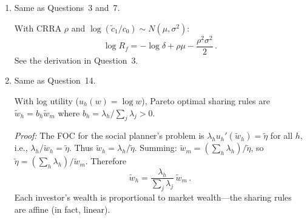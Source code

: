 \begin{enumerate}
\item Same as Questions~3 and~7.

With CRRA $\rho$ and $\log(\tilde{c}_1/c_0)\sim N(\mu,\sigma^2)$:
\[
\log R_f = -\log\delta + \rho\mu - \frac{\rho^2\sigma^2}{2}\,.
\]
See the derivation in Question~3.

\item Same as Question~14.

With log utility ($u_h(w)=\log w$), Pareto optimal sharing rules are $\tilde{w}_h = b_h\tilde{w}_m$ where $b_h = \lambda_h/\sum_j\lambda_j > 0$.

\textit{Proof:} The FOC for the social planner's problem is $\lambda_h u_h'(\tilde{w}_h) = \tilde{\eta}$ for all $h$, i.e., $\lambda_h/\tilde{w}_h = \tilde{\eta}$.  Thus $\tilde{w}_h = \lambda_h/\tilde{\eta}$.  Summing: $\tilde{w}_m = (\sum_h\lambda_h)/\tilde{\eta}$, so $\tilde{\eta} = (\sum_h\lambda_h)/\tilde{w}_m$.  Therefore
\[
\tilde{w}_h = \frac{\lambda_h}{\sum_j\lambda_j}\,\tilde{w}_m\,.
\]
Each investor's wealth is proportional to market wealth---the sharing rules are affine (in fact, linear).

\end{enumerate}


